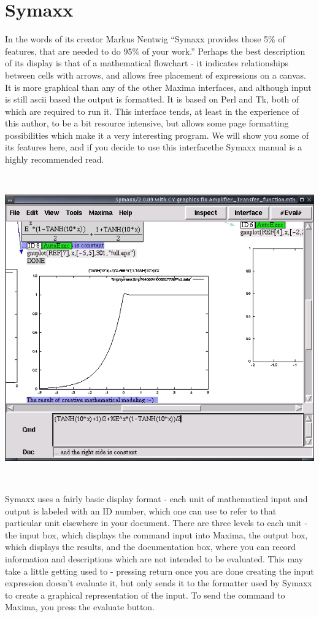 \section{Symaxx}

In the words of its creator Markus Nentwig ``Symaxx provides those 5\% of features,
that are needed to do 95\% of your work.'' Perhaps the best description
of its display is that of a mathematical flowchart - it indicates relationships
between cells with arrows, and allows free placement of expressions on a
canvas.  It is more graphical than
any of the other Maxima interfaces, and although input is still ascii
based the output is formatted. It is based on Perl and Tk, both of
which are required to run it. This interface tends, at least in the
experience of this author, to be a bit resource intensive, but allows
some page formatting possibilities which make it a very interesting
program. We will show you some of its features here, and if you decide to use
this interfacethe Symaxx manual is a highly recommended
read.

~

{\centering \includegraphics{images/symaxx} \par}

~
 
Symaxx uses a fairly basic display format - each unit of mathematical input
and output is labeled with an ID number, which one can use to refer to 
that particular unit elsewhere in your document.  There are three levels to
each unit - the input box, which displays the command input into Maxima,
the output box, which displays the results, and the documentation box,
where you can record information and descriptions which are not intended
to be evaluated.  This may take a little getting used to - pressing return
once you are done creating the input expression doesn't evaluate it, but only
sends it to the formatter used by Symaxx to create a graphical representation
of the input.  To send the command to Maxima, you press the evaluate button.

